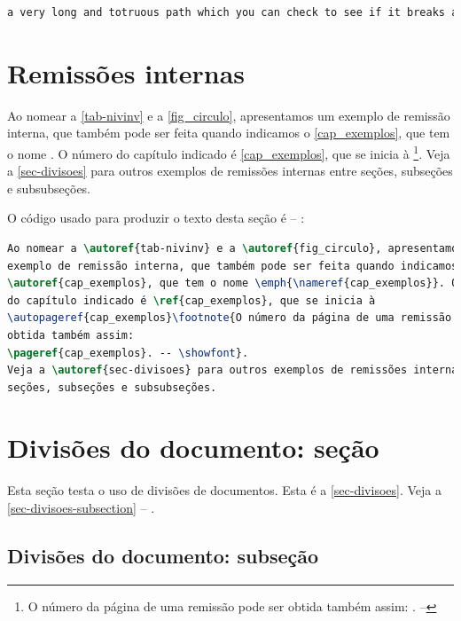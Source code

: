 \begin{lstlisting}[language=bash]
a very long and totruous path which you can check to see if it breaks and where at the end of the line
\end{lstlisting}



\section{Remissões internas}

Ao nomear a \autoref{tab-nivinv} e a \autoref{fig_circulo}, apresentamos um
exemplo de remissão interna, que também pode ser feita quando indicamos o
\autoref{cap_exemplos}, que tem o nome \emph{}. O número
do capítulo indicado é \ref{cap_exemplos}, que se inicia à
\footnote{O número da página de uma remissão pode ser
    obtida também assim:
    \pageref{cap_exemplos}. -- \showfont}.
Veja a \autoref{sec-divisoes} para outros exemplos de remissões internas entre
seções, subseções e subsubseções.

O código usado para produzir o texto desta seção é -- \showfont:

\begin{lstlisting}[language=TeX,caption={[TeX example]{TeX example -- \showfont}}]
Ao nomear a \autoref{tab-nivinv} e a \autoref{fig_circulo}, apresentamos um
exemplo de remissão interna, que também pode ser feita quando indicamos o
\autoref{cap_exemplos}, que tem o nome \emph{\nameref{cap_exemplos}}. O número
do capítulo indicado é \ref{cap_exemplos}, que se inicia à
\autopageref{cap_exemplos}\footnote{O número da página de uma remissão pode ser
obtida também assim:
\pageref{cap_exemplos}. -- \showfont}.
Veja a \autoref{sec-divisoes} para outros exemplos de remissões internas entre
seções, subseções e subsubseções.
\end{lstlisting}



\section{Divisões do documento: seção}\label{sec-divisoes}

Esta seção testa o uso de divisões de documentos. Esta é a
\autoref{sec-divisoes}. Veja a \autoref{sec-divisoes-subsection} -- \showfont.



\subsection{Divisões do documento: subseção}\label{sec-divisoes-subsection}

